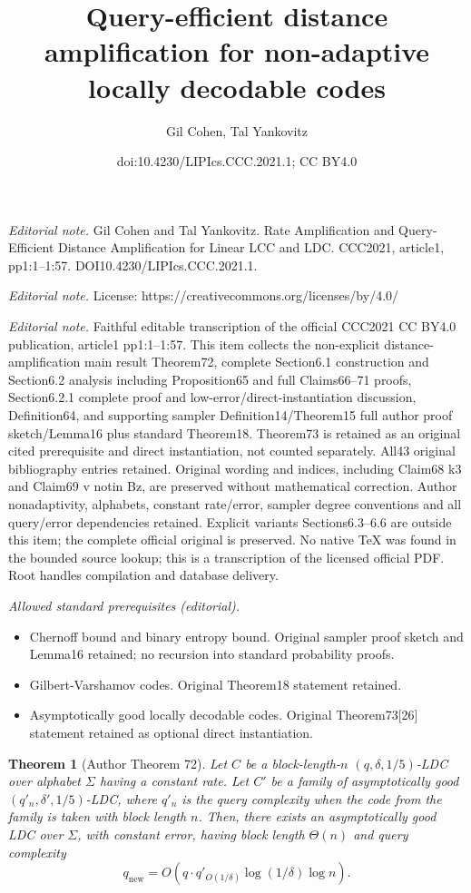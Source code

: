 \documentclass[10pt,a4paper]{article}
\title{Query-efficient distance amplification for non-adaptive locally decodable codes}
\author{Gil Cohen, Tal Yankovitz}
\date{doi:10.4230/LIPIcs.CCC.2021.1; CC BY4.0}
\newtheorem{nttheorem}{Theorem}
\begin{document}
\maketitle
\noindent\textit{Editorial note.} Gil Cohen and Tal Yankovitz. Rate Amplification and Query-Efficient Distance Amplification for Linear LCC and LDC. CCC2021, article1, pp1:1--1:57. DOI10.4230/LIPIcs.CCC.2021.1.\par\medskip
\noindent\textit{Editorial note.} License: https://creativecommons.org/licenses/by/4.0/\par\medskip
\noindent\textit{Editorial note.} Faithful editable transcription of the official CCC2021 CC BY4.0 publication, article1 pp1:1--1:57. This item collects the non-explicit distance-amplification main result Theorem72, complete Section6.1 construction and Section6.2 analysis including Proposition65 and full Claims66--71 proofs, Section6.2.1 complete proof and low-error/direct-instantiation discussion, Definition64, and supporting sampler Definition14/Theorem15 full author proof sketch/Lemma16 plus standard Theorem18. Theorem73 is retained as an original cited prerequisite and direct instantiation, not counted separately. All43 original bibliography entries retained. Original wording and indices, including Claim68 k3 and Claim69 v notin Bz, are preserved without mathematical correction. Author nonadaptivity, alphabets, constant rate/error, sampler degree conventions and all query/error dependencies retained. Explicit variants Sections6.3--6.6 are outside this item; the complete official original is preserved. No native TeX was found in the bounded source lookup; this is a transcription of the licensed official PDF. Root handles compilation and database delivery.\par\medskip
\noindent\textit{Allowed standard prerequisites (editorial).}\begin{itemize}
\item Chernoff bound and binary entropy bound. Original sampler proof sketch and Lemma16 retained; no recursion into standard probability proofs.
\item Gilbert-Varshamov codes. Original Theorem18 statement retained.
\item Asymptotically good locally decodable codes. Original Theorem73[26] statement retained as optional direct instantiation.
\end{itemize}\medskip
\setcounter{nttheorem}{71}
\begin{nttheorem}[Author Theorem 72]
Let $C$ be a block-length-$n$ $(q,\delta,1/5)$-LDC over alphabet $\Sigma$ having a constant rate. Let $C'$ be a family of asymptotically good $(q'_n,\delta',1/5)$-LDC, where $q'_n$ is the query complexity when the code from the family is taken with block length $n$. Then, there exists an asymptotically good LDC over $\Sigma$, with constant error, having block length $\Theta(n)$ and query complexity
\begin{equation}q_{\mathrm{new}}=O\left(q\cdot q'_{O(1/\delta)}\log(1/\delta)\log n\right).\tag{6.2}\end{equation}
\end{nttheorem}
\end{document}
